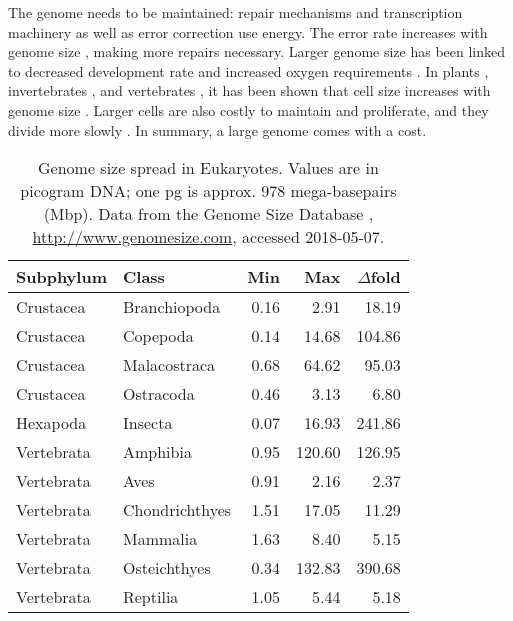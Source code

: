 The genome needs to be maintained: repair mechanisms and transcription
machinery as well as error correction use energy. The error rate
increases with genome size \citep{Wielgoss2011}, making more repairs
necessary. Larger genome size has been linked to decreased development
rate \citep{White2000} and increased oxygen requirements
\citep{Vinogradov1997, Gregory2002}. In plants \citep{Grime1983},
invertebrates \citep{Gregory2005}, and vertebrates \citep{Horner1983,
Olmo1982, Gregory2000}, it has been shown that cell size increases with
genome size \citep{Dufresne2011}. Larger cells are also costly to
maintain and proliferate, and they divide more slowly
\citep{Bennett1977}. In summary, a large genome comes with a cost.


\begin{table}[h]
\centering
\caption{Genome size spread in Eukaryotes. Values are in picogram DNA;
one pg is approx. 978 mega-basepairs (Mbp). Data from the Genome Size
Database \citep{Gregory2018}, \url{http://www.genomesize.com}, accessed
2018-05-07.}
\label{tab:genome-size-spread}
\begin{tabular}{@{}llrrr@{}}
\toprule
Subphylum  & Class              & Min  & Max    & $\Delta$fold  \\
\midrule
Crustacea  & Branchiopoda       & 0.16 &   2.91 &  18.19        \\
Crustacea  & Copepoda           & 0.14 &  14.68 & 104.86        \\
Crustacea  & Malacostraca       & 0.68 &  64.62 &  95.03        \\
Crustacea  & Ostracoda          & 0.46 &   3.13 &   6.80        \\
Hexapoda   & Insecta            & 0.07 &  16.93 & 241.86        \\
Vertebrata & Amphibia           & 0.95 & 120.60 & 126.95        \\
Vertebrata & Aves               & 0.91 &   2.16 &   2.37        \\
Vertebrata & Chondrichthyes     & 1.51 &  17.05 &  11.29        \\
Vertebrata & Mammalia           & 1.63 &   8.40 &   5.15        \\
Vertebrata & Osteichthyes       & 0.34 & 132.83 & 390.68        \\
Vertebrata & Reptilia           & 1.05 &   5.44 &   5.18        \\
\bottomrule
\end{tabular}
\end{table}


